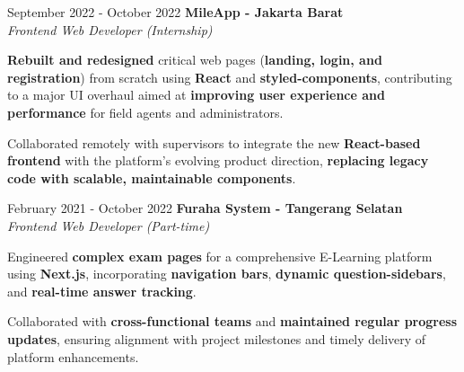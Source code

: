 \documentclass[../main.tex]{subfiles}
\begin{document}
\vspace{0.40 cm}

\begin{twocolentry}{September 2022 - October 2022}
    \textbf{MileApp \color{Gray}- Jakarta Barat}\\
    \textit{Frontend Web Developer (Internship)}
\end{twocolentry}

\vspace{0.10 cm}
\begin{onecolentry}
\begin{highlights}
    \item \textbf{Rebuilt and redesigned} critical web pages (\textbf{landing, login, and registration}) from scratch using \textbf{React} and \textbf{styled-components}, contributing to a major UI overhaul aimed at \textbf{improving user experience and performance} for field agents and administrators.
    \item Collaborated remotely with supervisors to integrate the new \textbf{React-based frontend} with the platform’s evolving product direction, \textbf{replacing legacy code with scalable, maintainable components}.
\end{highlights}
\end{onecolentry}

\vspace{0.40 cm}

\begin{twocolentry}{February 2021 - October 2022}
    \textbf{Furaha System \color{Gray}- Tangerang Selatan}\\
    \textit{Frontend Web Developer (Part-time)}
\end{twocolentry}

\vspace{0.10 cm}
\begin{onecolentry}
\begin{highlights}
    \item Engineered \textbf{complex exam pages} for a comprehensive E-Learning platform using \textbf{Next.js}, incorporating \textbf{navigation bars}, \textbf{dynamic question-sidebars}, and \textbf{real-time answer tracking}.
    \item Collaborated with \textbf{cross-functional teams} and \textbf{maintained regular progress updates}, ensuring alignment with project milestones and timely delivery of platform enhancements.
\end{highlights}
\end{onecolentry}
\end{document}

